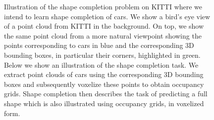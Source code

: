 \begin{figure}[t]
  \vspace{-0.5cm}
  
  \caption{Illustration of the shape completion problem on
  KITTI \cite{GeigerLenzUrtasun:2012,GeigerLenzStillerUrtasun:2013} where we
  intend to learn shape completion of cars. We show a bird's eye view
  of a point cloud from KITTI in the background. On top, we show the same point cloud from
  a more natural viewpoint showing the points corresponding to cars
  in blue and the corresponding 3D bounding boxes, in particular their corners,
  highlighted in green. Below we show an illustration of the shape completion
  task. We extract point clouds of cars using the corresponding 3D bounding boxes
  and subsequently voxelize these points to obtain occupancy grids.
  Shape completion then describes the task of predicting a full shape which
  is also illustrated using occupancy grids, \ie in voxelized form.}
  \label{fig:introduction}
\end{figure}


